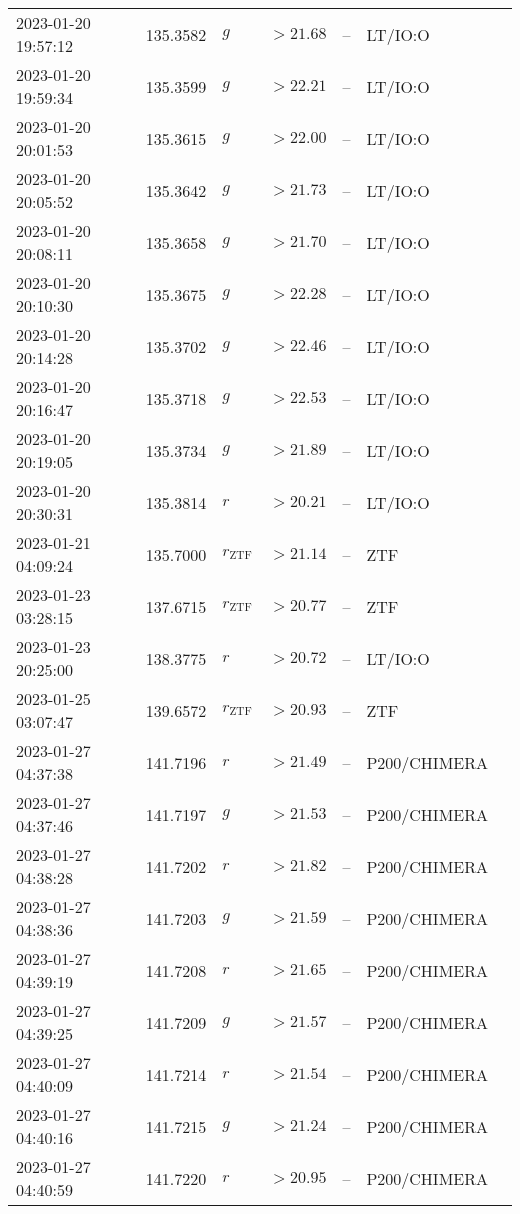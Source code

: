 \documentclass{nature_plusfigure}
\begin{document}
\begin{supplement}
\begin{center}
\begin{longtable}{lllllll}
2023-01-20 19:57:12 & 135.3582 & $g$ & $>21.68$ & -- & LT/IO:O &  \\ 
2023-01-20 19:59:34 & 135.3599 & $g$ & $>22.21$ & -- & LT/IO:O &  \\ 
2023-01-20 20:01:53 & 135.3615 & $g$ & $>22.00$ & -- & LT/IO:O &  \\ 
2023-01-20 20:05:52 & 135.3642 & $g$ & $>21.73$ & -- & LT/IO:O &  \\ 
2023-01-20 20:08:11 & 135.3658 & $g$ & $>21.70$ & -- & LT/IO:O &  \\ 
2023-01-20 20:10:30 & 135.3675 & $g$ & $>22.28$ & -- & LT/IO:O &  \\ 
2023-01-20 20:14:28 & 135.3702 & $g$ & $>22.46$ & -- & LT/IO:O &  \\ 
2023-01-20 20:16:47 & 135.3718 & $g$ & $>22.53$ & -- & LT/IO:O &  \\ 
2023-01-20 20:19:05 & 135.3734 & $g$ & $>21.89$ & -- & LT/IO:O &  \\ 
2023-01-20 20:30:31 & 135.3814 & $r$ & $>20.21$ & -- & LT/IO:O &  \\ 
2023-01-21 04:09:24 & 135.7000 & ${r}_\mathrm{ZTF}$ & $>21.14$ & -- & ZTF &  \\ 
2023-01-23 03:28:15 & 137.6715 & ${r}_\mathrm{ZTF}$ & $>20.77$ & -- & ZTF &  \\ 
2023-01-23 20:25:00 & 138.3775 & $r$ & $>20.72$ & -- & LT/IO:O &  \\ 
2023-01-25 03:07:47 & 139.6572 & ${r}_\mathrm{ZTF}$ & $>20.93$ & -- & ZTF &  \\ 
2023-01-27 04:37:38 & 141.7196 & $r$ & $>21.49$ & -- & P200/CHIMERA &  \\ 
2023-01-27 04:37:46 & 141.7197 & $g$ & $>21.53$ & -- & P200/CHIMERA &  \\ 
2023-01-27 04:38:28 & 141.7202 & $r$ & $>21.82$ & -- & P200/CHIMERA &  \\ 
2023-01-27 04:38:36 & 141.7203 & $g$ & $>21.59$ & -- & P200/CHIMERA &  \\ 
2023-01-27 04:39:19 & 141.7208 & $r$ & $>21.65$ & -- & P200/CHIMERA &  \\ 
2023-01-27 04:39:25 & 141.7209 & $g$ & $>21.57$ & -- & P200/CHIMERA &  \\ 
2023-01-27 04:40:09 & 141.7214 & $r$ & $>21.54$ & -- & P200/CHIMERA &  \\ 
2023-01-27 04:40:16 & 141.7215 & $g$ & $>21.24$ & -- & P200/CHIMERA &  \\ 
2023-01-27 04:40:59 & 141.7220 & $r$ & $>20.95$ & -- & P200/CHIMERA &  \\ 

\end{longtable}
\end{center}
\end{supplement}
\end{document}
